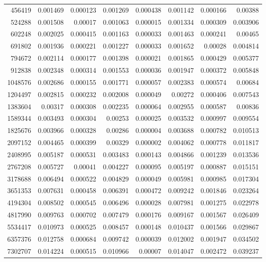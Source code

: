 \begin{longtable}{r r r r r r r r}
456419 & 0.001469 & 0.000123 & 0.001269 & 0.000438 & 0.001142 & 0.000166 & 0.00388 \\
524288 & 0.001508 & 0.00017 & 0.001063 & 0.000015 & 0.001334 & 0.000309 & 0.003906 \\
602248 & 0.002025 & 0.000415 & 0.001163 & 0.000033 & 0.001463 & 0.000241 & 0.00465 \\
691802 & 0.001936 & 0.000221 & 0.001227 & 0.000033 & 0.001652 & 0.00028 & 0.004814 \\
794672 & 0.002114 & 0.000177 & 0.001398 & 0.000021 & 0.001865 & 0.000429 & 0.005377 \\
912838 & 0.002348 & 0.000314 & 0.001553 & 0.000036 & 0.001947 & 0.000372 & 0.005848 \\
1048576 & 0.002686 & 0.000155 & 0.001771 & 0.000057 & 0.002383 & 0.000574 & 0.00684 \\
1204497 & 0.002815 & 0.000232 & 0.002008 & 0.000049 & 0.00272 & 0.000406 & 0.007543 \\
1383604 & 0.00317 & 0.000308 & 0.002235 & 0.000064 & 0.002955 & 0.000587 & 0.00836 \\
1589344 & 0.003493 & 0.000304 & 0.00253 & 0.000025 & 0.003532 & 0.000997 & 0.009554 \\
1825676 & 0.003966 & 0.000328 & 0.00286 & 0.000004 & 0.003688 & 0.000782 & 0.010513 \\
2097152 & 0.004465 & 0.000399 & 0.00329 & 0.000002 & 0.004062 & 0.000778 & 0.011817 \\
2408995 & 0.005187 & 0.000531 & 0.003483 & 0.000143 & 0.004866 & 0.001239 & 0.013536 \\
2767208 & 0.005727 & 0.00041 & 0.004227 & 0.000095 & 0.005197 & 0.000887 & 0.015151 \\
3178688 & 0.006494 & 0.000522 & 0.004829 & 0.000049 & 0.005981 & 0.000985 & 0.017304 \\
3651353 & 0.007631 & 0.000458 & 0.006391 & 0.000472 & 0.009242 & 0.001846 & 0.023264 \\
4194304 & 0.008502 & 0.000545 & 0.006496 & 0.000028 & 0.007981 & 0.001275 & 0.022978 \\
4817990 & 0.009763 & 0.000702 & 0.007479 & 0.000176 & 0.009167 & 0.001567 & 0.026409 \\
5534417 & 0.010973 & 0.000525 & 0.008457 & 0.000148 & 0.010437 & 0.001566 & 0.029867 \\
6357376 & 0.012758 & 0.000684 & 0.009742 & 0.000039 & 0.012002 & 0.001947 & 0.034502 \\
7302707 & 0.014224 & 0.000515 & 0.010966 & 0.00007 & 0.014047 & 0.002472 & 0.039237 \\

\end{longtable}
